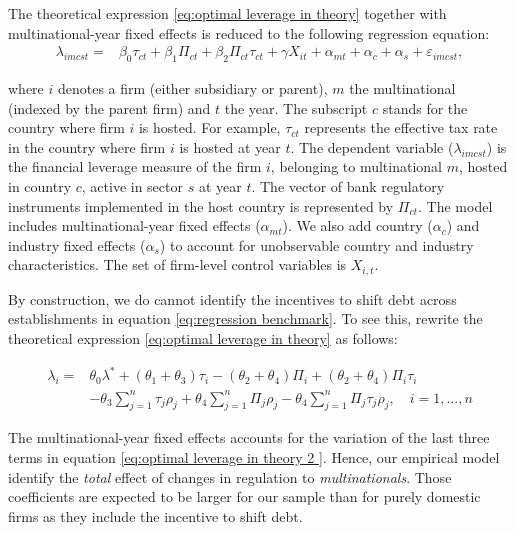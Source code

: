 \documentclass[12pt]{article}
\begin{document}
    The theoretical expression \ref{eq:optimal leverage in theory} together with multinational-year fixed effects is reduced to the following regression equation:
    \begin{equation}
    \begin{aligned}
    \lambda_{imcst}=&\beta_0\tau_{ct}+\beta_1\Pi_{ct}+\beta_2\Pi_{ct}\tau_{ct}+\gamma X_{it}+\alpha_{mt}+\alpha_{c}+\alpha_{s}+\varepsilon_{imcst},
    \label{eq:regression benchmark}
    \end{aligned}
    \end{equation}

    where $i$ denotes a firm (either subsidiary or parent), $m$ the multinational (indexed by the parent firm) and $t$ the year. The subscript $c$ stands for the country where firm $i$ is hosted. For example, $\tau_{ct}$ represents the effective tax rate in the country where firm $i$ is hosted at year $t$. The dependent variable ($\lambda_{imcst}$) is the financial leverage measure of the firm $i$, belonging to multinational $m$, hosted in country $c$, active in sector $s$ at year $t$. The vector of bank regulatory instruments implemented in the host country is represented by $\Pi_{ct}$. The model includes multinational-year fixed effects ($\alpha_{mt}$). We also add country ($\alpha_c$) and industry fixed effects ($\alpha_s$) to account for unobservable country and industry characteristics. The set of firm-level control variables is $X_{i,t}$.

    By construction, we do cannot identify the incentives to shift debt across establishments in equation \ref{eq:regression benchmark}. To see this, rewrite the theoretical expression \ref{eq:optimal leverage in theory} as follows: 

    \begin{equation}
    \begin{aligned}
    \lambda_i=&\theta_0\lambda^*+(\theta_1+\theta_3)\tau_i-(\theta_2+\theta_4)\Pi_i+(\theta_2+\theta_4)\Pi_i\tau_{i}\\
    &-\theta_3\sum_{j=1}^{n}\tau_j\rho_j
    +\theta_4\sum_{j=1}^{n}\Pi_j\rho_j
    -\theta_4\sum_{j=1}^{n}\Pi_j\tau_j\rho_j, \quad i=1,...,n
    \end{aligned}
    \label{eq:optimal leverage in theory 2 }
    \end{equation}
    
    The multinational-year fixed effects accounts for the variation of the last three terms in equation \ref{eq:optimal leverage in theory 2 }. Hence, our empirical model identify the \textit{total} effect of changes in regulation to \textit{multinationals}. Those coefficients are expected to be larger for our sample than for purely domestic firms as they include the incentive to shift debt.
\end{document}
